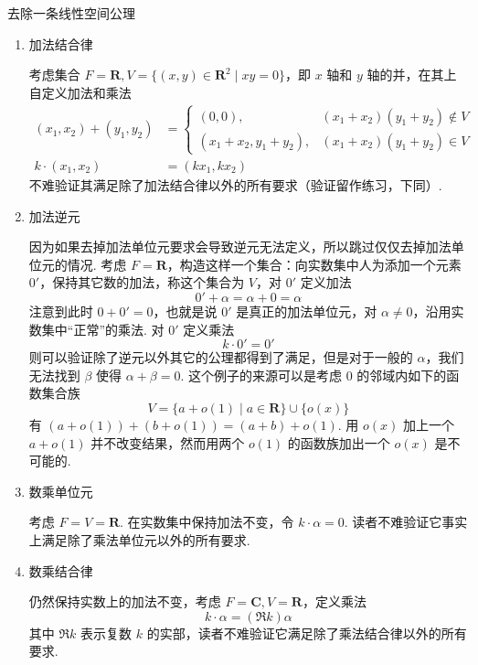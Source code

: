 \begin{example}{}{去除一条线性空间公理}
    \begin{enumerate}
        \item 加法结合律

        考虑集合 $F = \mathbf{R}, V = \{(x, y)\in\mathbf{R}^2 \mid xy = 0\}$，即 $x$ 轴和 $y$ 轴的并，在其上自定义加法和乘法
        \begin{align*}
            (x_1, x_2) + (y_1, y_2) &= \begin{cases}
                (0, 0), & (x_1+x_2)(y_1+y_2) \notin V\\
                (x_1+x_2, y_1+y_2), & (x_1+x_2)(y_1+y_2) \in V
            \end{cases} \\
            k\cdot (x_1, x_2) &= (k x_1, k x_2)
        \end{align*}
        不难验证其满足除了加法结合律以外的所有要求（验证留作练习，下同）.

        \item 加法逆元

        因为如果去掉加法单位元要求会导致逆元无法定义，所以跳过仅仅去掉加法单位元的情况. 考虑 $F = \mathbf{R}$，构造这样一个集合：向实数集中人为添加一个元素 $0'$，保持其它数的加法，称这个集合为 $V$，对 $0'$ 定义加法
        \[
            0' + \alpha = \alpha + 0 = \alpha
        \]
        注意到此时 $0 + 0' = 0$，也就是说 $0'$ 是真正的加法单位元，对 $\alpha\ne 0$，沿用实数集中``正常''的乘法. 对 $0'$ 定义乘法
        \[
            k\cdot 0' = 0'
        \]
        则可以验证除了逆元以外其它的公理都得到了满足，但是对于一般的 $\alpha$，我们无法找到 $\beta$ 使得 $\alpha + \beta = 0$. 这个例子的来源可以是考虑 $0$ 的邻域内如下的函数集合族
        \[
            V = \{a+o(1)\mid a\in\mathbf{R}\} \cup \{o(x)\}
        \]
        有 $(a+o(1)) + (b+o(1)) = (a+b) + o(1)$. 用 $o(x)$ 加上一个 $a+o(1)$ 并不改变结果，然而用两个 $o(1)$ 的函数族加出一个 $o(x)$ 是不可能的.

        \item 数乘单位元

        考虑 $F = V = \mathbf{R}$. 在实数集中保持加法不变，令 $k\cdot \alpha = 0$. 读者不难验证它事实上满足除了乘法单位元以外的所有要求.

        \item 数乘结合律

        仍然保持实数上的加法不变，考虑 $F=\mathbf{C}, V=\mathbf{R}$，定义乘法
        \[
            k\cdot \alpha = (\Re k) \alpha
        \]
        其中 $\Re k$ 表示复数 $k$ 的实部，读者不难验证它满足除了乘法结合律以外的所有要求.


\end{enumerate}
\end{example}
